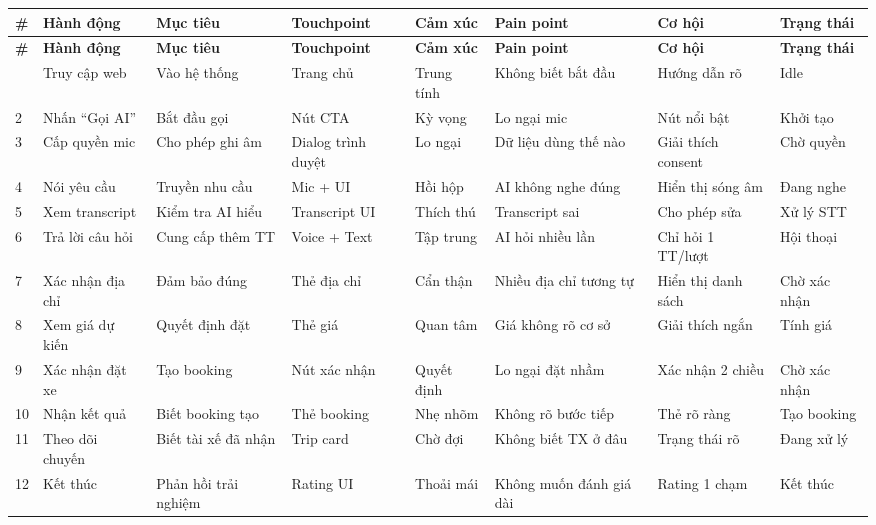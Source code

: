 \documentclass[12pt,a4paper]{article}
\begin{document}
\begin{longtable}{C{0.4cm} L{1.8cm} L{2.2cm} L{1.8cm} L{1.5cm} L{1.8cm} L{2cm} L{2cm}}
  \toprule
  \textbf{\#}&\textbf{Hành động}&\textbf{Mục tiêu}&\textbf{Touchpoint}&\textbf{Cảm xúc}&\textbf{Pain point}&\textbf{Cơ hội}&\textbf{Trạng thái}\\
  \midrule\endfirsthead
  \toprule{}\textbf{\#}&\textbf{Hành động}&\textbf{Mục tiêu}&\textbf{Touchpoint}&\textbf{Cảm xúc}&\textbf{Pain point}&\textbf{Cơ hội}&\textbf{Trạng thái}\\
  \midrule\endhead\bottomrule{} & Truy cập web & Vào hệ thống & Trang chủ & Trung tính & Không biết bắt đầu & Hướng dẫn rõ & Idle \\
  2 & Nhấn ``Gọi AI'' & Bắt đầu gọi & Nút CTA & Kỳ vọng & Lo ngại mic & Nút nổi bật & Khởi tạo \\
  3 & Cấp quyền mic & Cho phép ghi âm & Dialog trình duyệt & Lo ngại & Dữ liệu dùng thế nào & Giải thích consent & Chờ quyền \\
  4 & Nói yêu cầu & Truyền nhu cầu & Mic + UI & Hồi hộp & AI không nghe đúng & Hiển thị sóng âm & Đang nghe \\
  5 & Xem transcript & Kiểm tra AI hiểu & Transcript UI & Thích thú & Transcript sai & Cho phép sửa & Xử lý STT \\
  6 & Trả lời câu hỏi & Cung cấp thêm TT & Voice + Text & Tập trung & AI hỏi nhiều lần & Chỉ hỏi 1 TT/lượt & Hội thoại \\
  7 & Xác nhận địa chỉ & Đảm bảo đúng & Thẻ địa chỉ & Cẩn thận & Nhiều địa chỉ tương tự & Hiển thị danh sách & Chờ xác nhận \\
  8 & Xem giá dự kiến & Quyết định đặt & Thẻ giá & Quan tâm & Giá không rõ cơ sở & Giải thích ngắn & Tính giá \\
  9 & Xác nhận đặt xe & Tạo booking & Nút xác nhận & Quyết định & Lo ngại đặt nhầm & Xác nhận 2 chiều & Chờ xác nhận \\
  10 & Nhận kết quả & Biết booking tạo & Thẻ booking & Nhẹ nhõm & Không rõ bước tiếp & Thẻ rõ ràng & Tạo booking \\
  11 & Theo dõi chuyến & Biết tài xế đã nhận & Trip card & Chờ đợi & Không biết TX ở đâu & Trạng thái rõ & Đang xử lý \\
  12 & Kết thúc & Phản hồi trải nghiệm & Rating UI & Thoải mái & Không muốn đánh giá dài & Rating 1 chạm & Kết thúc \\
\end{longtable}
\end{document}
